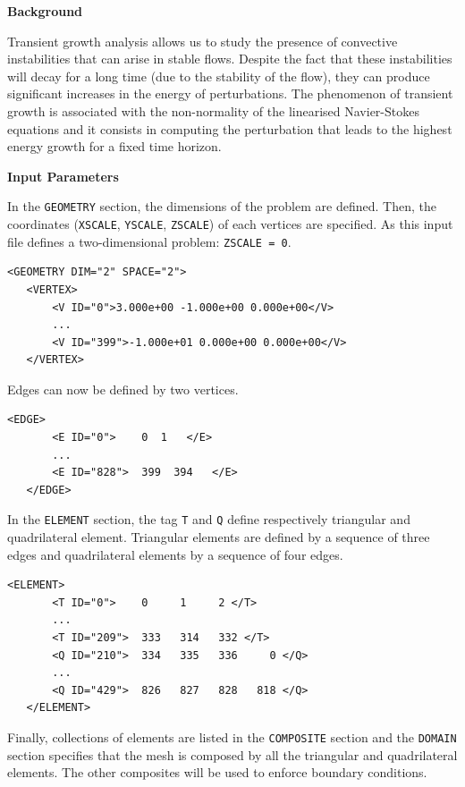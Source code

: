 \textbf{Background}

Transient growth analysis allows us to study the presence of convective instabilities that can arise in stable flows. Despite the fact that these instabilities will decay for a long time (due to the stability of the flow), they can produce significant increases in the energy of perturbations. The phenomenon of transient growth is associated with the non-normality of the linearised Navier-Stokes equations and it consists in computing the perturbation that leads to the highest energy growth for a fixed time horizon.

\textbf{Input Parameters}

In the \texttt{GEOMETRY} section, the dimensions of the problem are defined. Then, the coordinates (\texttt{XSCALE}, \texttt{YSCALE}, \texttt{ZSCALE}) of each vertices are specified. As this input file defines a two-dimensional problem: \texttt{ZSCALE = 0}.

      \begin{lstlisting}[style=XMLStyle]
<GEOMETRY DIM="2" SPACE="2">
   <VERTEX>
       <V ID="0">3.000e+00 -1.000e+00 0.000e+00</V>
       ...
       <V ID="399">-1.000e+01 0.000e+00 0.000e+00</V>
   </VERTEX>
     \end{lstlisting}

Edges can now be defined by two vertices.

      \begin{lstlisting}[style=XMLStyle]
<EDGE>
       <E ID="0">    0  1   </E>
       ...
       <E ID="828">  399  394   </E>
   </EDGE>
        \end{lstlisting}

In the \texttt{ELEMENT} section, the tag \texttt{T} and \texttt{Q} define respectively triangular and quadrilateral element. Triangular elements are defined by a sequence of three edges and quadrilateral elements by a sequence of four edges.

      \begin{lstlisting}[style=XMLStyle]
<ELEMENT>
       <T ID="0">    0     1     2 </T>
       ...
       <T ID="209">  333   314   332 </T>
       <Q ID="210">  334   335   336     0 </Q>
       ...
       <Q ID="429">  826   827   828   818 </Q>
   </ELEMENT>
        \end{lstlisting}

Finally, collections of elements are listed in the \texttt{COMPOSITE} section and the \texttt{DOMAIN} section specifies that the mesh is composed by all the triangular and quadrilateral elements. The other composites will be used to enforce boundary conditions.

